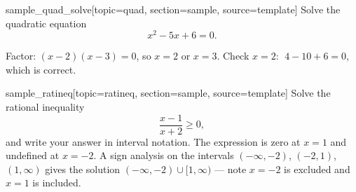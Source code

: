 %
%
%

\begin{problem}{sample_quad_solve}[topic=quad, section=sample, source=template]
	Solve the quadratic equation
	\[ x^2 - 5x + 6 = 0. \]
	\solution
	Factor: $(x - 2)(x - 3) = 0$, so $x = 2$ or $x = 3$.
	Check $x = 2$: $\;4 - 10 + 6 = 0$, which is correct.
\end{problem}

\begin{problem}{sample_ratineq}[topic=ratineq, section=sample, source=template]
	Solve the rational inequality
	\[ \frac{x - 1}{x + 2} \ge 0, \]
	and write your answer in interval notation.
	\solution
	The expression is zero at $x = 1$ and undefined at $x = -2$. A sign
	analysis on the intervals $(-\infty, -2)$, $(-2, 1)$, $(1, \infty)$
	gives the solution $(-\infty, -2) \cup [1, \infty)$ — note $x = -2$
	is excluded and $x = 1$ is included.
\end{problem}

